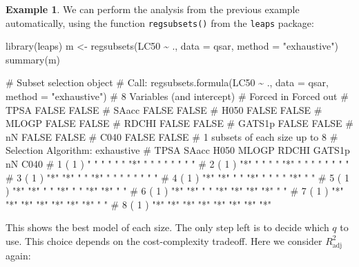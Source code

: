\documentclass[
  a4paper,
]{article}
\newenvironment{Shaded}{\begin{snugshade}}{\end{snugshade}}
\newcommand{\AttributeTok}[1]{\textcolor[rgb]{0.77,0.63,0.00}{#1}}
\newcommand{\FunctionTok}[1]{\textcolor[rgb]{0.00,0.00,0.00}{#1}}
\newcommand{\NormalTok}[1]{#1}
\newcommand{\OtherTok}[1]{\textcolor[rgb]{0.56,0.35,0.01}{#1}}
\newcommand{\SpecialCharTok}[1]{\textcolor[rgb]{0.00,0.00,0.00}{#1}}
\newcommand{\StringTok}[1]{\textcolor[rgb]{0.31,0.60,0.02}{#1}}
\theoremstyle{definition}
\theoremstyle{definition}
\newtheorem{example}{Example}[section]
\theoremstyle{definition}
\theoremstyle{definition}
\theoremstyle{remark}
\begin{document}
\begin{example}
We can perform the analysis from the previous example automatically,
using the function \texttt{regsubsets()} from the \texttt{leaps} package:

\begin{Shaded}
\begin{Highlighting}[]
\FunctionTok{library}\NormalTok{(leaps)}
\NormalTok{m }\OtherTok{\textless{}{-}} \FunctionTok{regsubsets}\NormalTok{(LC50 }\SpecialCharTok{\textasciitilde{}}\NormalTok{ ., }\AttributeTok{data =}\NormalTok{ qsar,}
                \AttributeTok{method =} \StringTok{"exhaustive"}\NormalTok{)}
\FunctionTok{summary}\NormalTok{(m)}
\end{Highlighting}
\end{Shaded}

\begin{Shaded}
\begin{Highlighting}[]
\NormalTok{\# Subset selection object}
\NormalTok{\# Call: regsubsets.formula(LC50 \textasciitilde{} ., data = qsar, method = "exhaustive")}
\NormalTok{\# 8 Variables  (and intercept)}
\NormalTok{\#        Forced in Forced out}
\NormalTok{\# TPSA       FALSE      FALSE}
\NormalTok{\# SAacc      FALSE      FALSE}
\NormalTok{\# H050       FALSE      FALSE}
\NormalTok{\# MLOGP      FALSE      FALSE}
\NormalTok{\# RDCHI      FALSE      FALSE}
\NormalTok{\# GATS1p     FALSE      FALSE}
\NormalTok{\# nN         FALSE      FALSE}
\NormalTok{\# C040       FALSE      FALSE}
\NormalTok{\# 1 subsets of each size up to 8}
\NormalTok{\# Selection Algorithm: exhaustive}
\NormalTok{\#          TPSA SAacc H050 MLOGP RDCHI GATS1p nN  C040}
\NormalTok{\# 1  ( 1 ) " "  " "   " "  "*"   " "   " "    " " " " }
\NormalTok{\# 2  ( 1 ) "*"  " "   " "  "*"   " "   " "    " " " " }
\NormalTok{\# 3  ( 1 ) "*"  "*"   " "  "*"   " "   " "    " " " " }
\NormalTok{\# 4  ( 1 ) "*"  "*"   " "  "*"   " "   " "    "*" " " }
\NormalTok{\# 5  ( 1 ) "*"  "*"   " "  "*"   " "   "*"    "*" " " }
\NormalTok{\# 6  ( 1 ) "*"  "*"   " "  "*"   "*"   "*"    "*" " " }
\NormalTok{\# 7  ( 1 ) "*"  "*"   "*"  "*"   "*"   "*"    "*" " " }
\NormalTok{\# 8  ( 1 ) "*"  "*"   "*"  "*"   "*"   "*"    "*" "*"}
\end{Highlighting}
\end{Shaded}

This shows the best model of each size. The only step left is
to decide which \(q\) to use. This choice depends on the cost-complexity
tradeoff. Here we consider \(R^2_\mathrm{adj}\) again:


\end{example}
\end{document}
